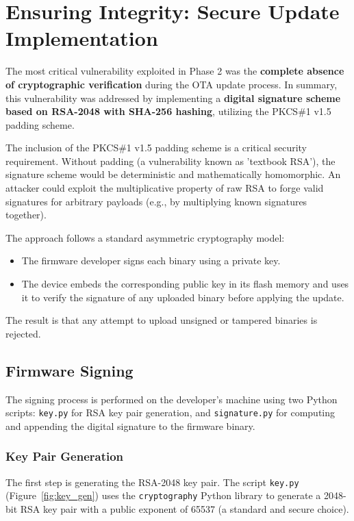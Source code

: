 \section{Ensuring Integrity: Secure Update Implementation}
The most critical vulnerability exploited in Phase 2 was the \textbf{complete absence of cryptographic verification} during the OTA update process. In summary, this vulnerability was addressed by implementing a \textbf{digital signature scheme based on RSA-2048 with SHA-256 hashing}, utilizing the PKCS\#1 v1.5 padding scheme.

\medskip
\noindent The inclusion of the PKCS\#1 v1.5 padding scheme is a critical security requirement. Without padding (a vulnerability known as 'textbook RSA'), the signature scheme would be deterministic and mathematically homomorphic. An attacker could exploit the multiplicative property of raw RSA to forge valid signatures for arbitrary payloads (e.g., by multiplying known signatures together). 

\medskip
\noindent The approach follows a standard asymmetric cryptography model:

\begin{itemize}
    \item The firmware developer signs each binary using a private key.
    \item The device embeds the corresponding public key in its flash memory and uses it to verify the signature of any uploaded binary before applying the update.
\end{itemize}

\noindent The result is that any attempt to upload unsigned or tampered binaries is rejected.


\subsection{Firmware Signing}
The signing process is performed on the developer's machine using two Python scripts: \texttt{key.py} for RSA key pair generation, and \texttt{signature.py} for computing and appending the digital signature to the firmware binary.

\subsubsection{Key Pair Generation}
The first step is generating the RSA-2048 key pair. The script \texttt{key.py} (Figure~\ref{fig:key_gen}) uses the \texttt{cryptography} Python library to generate a 2048-bit RSA key pair with a public exponent of 65537 (a standard and secure choice).


